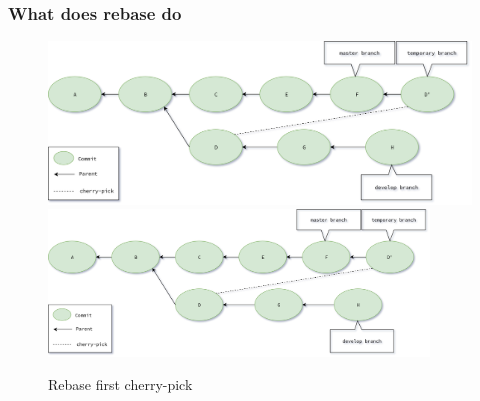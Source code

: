 \begin{frame}
    \frametitle{What does rebase do}
    \addtocounter{page}{-1}
    \begin{figure}
        \begin{center}
            {
                \includegraphics[width=1\textwidth,keepaspectratio]{./images/Rebase_FirstCherryPick.png}
            }
            {
                \includegraphics[width=0.9\textwidth,keepaspectratio]{./images/Rebase_FirstCherryPick.png}
            }
            \caption{Rebase first cherry-pick}
        \end{center}
    \end{figure}
\end{frame}

